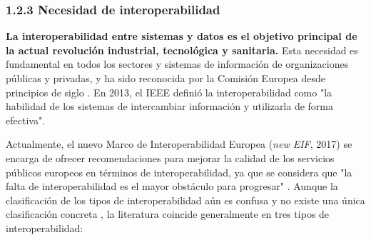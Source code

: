 \begin{itemize}
\end{itemize}

\subsubsection{1.2.3 Necesidad de interoperabilidad}


\textbf{La interoperabilidad entre sistemas y datos es el objetivo principal de la actual revolución industrial, tecnológica y sanitaria.} Esta necesidad es fundamental en todos los sectores y sistemas de información de organizaciones públicas y privadas, y ha sido reconocida por la Comisión Europea desde principios de siglo \cite{CEU1999ida}. En 2013, el IEEE definió la interoperabilidad como "la habilidad de los sistemas de intercambiar información y utilizarla de forma efectiva". 

Actualmente, el nuevo Marco de Interoperabilidad Europea (\textit{new EIF}, 2017) se encarga de ofrecer recomendaciones para mejorar la calidad de los servicios públicos europeos en términos de interoperabilidad, ya que se considera que "la falta de interoperabilidad es el mayor obstáculo para progresar" \cite{kouroubali2019new}. Aunque la clasificación de los tipos de interoperabilidad aún es confusa y no existe una única clasificación concreta \cite{santos2021interoperability}, la literatura coincide generalmente en tres tipos de interoperabilidad:

